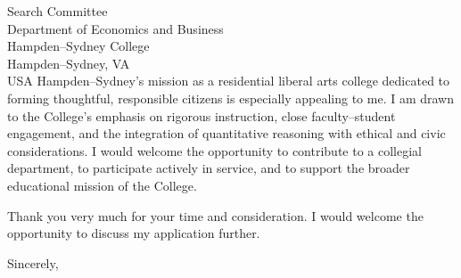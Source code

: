 \documentclass[11pt,letterpaper]{letter}
\begin{document}
\begin{letter}{Search Committee \\
Department of Economics and Business \\
Hampden--Sydney College \\
Hampden--Sydney, VA \\ USA}
Hampden--Sydney’s mission as a residential liberal arts college dedicated to forming thoughtful, responsible citizens is especially appealing to me. I am drawn to the College’s emphasis on rigorous instruction, close faculty–student engagement, and the integration of quantitative reasoning with ethical and civic considerations. I would welcome the opportunity to contribute to a collegial department, to participate actively in service, and to support the broader educational mission of the College.

Thank you very much for your time and consideration. I would welcome the opportunity to discuss my application further.

\closing{Sincerely,}

\end{letter}
\end{document}
